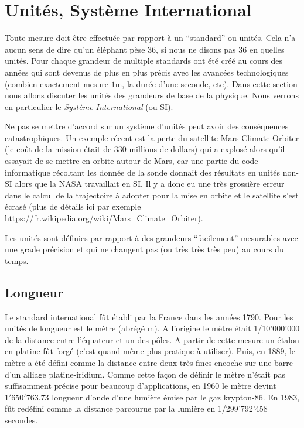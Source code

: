 \documentclass[a4paper,12pt]{book}
\newcommand{\m}{\mathrm{m}}
\begin{document}
\section{Unités, Système International}

Toute mesure doit être effectuée par rapport à un ``standard'' ou unités. Cela n'a aucun sens de dire qu'un éléphant pèse 36, si nous ne disons pas
36 en quelles unités. Pour chaque grandeur de multiple standards ont été créé au cours des années qui sont devenus de plus en plus précis
avec les avancées technologiques (combien exactement mesure $1\m$, la durée d'une seconde, etc). 
Dans cette section nous allons discuter les unités des grandeurs de base  de la physique. Nous verrons en particulier le \textit{Système International} (ou SI).

Ne pas se mettre d'accord sur un système d'unités peut avoir des conséquences catastrophiques. Un exemple récent 
est la perte du satellite Mars Climate Orbiter (le coût de la mission était de 330 millions de dollars) 
qui a explosé alors qu'il essayait de se mettre en orbite autour de Mars,
car une partie du code informatique récoltant les donnée de la sonde donnait des résultats en unités 
non-SI alors que la NASA travaillait en SI. Il y a donc eu une très grossière erreur dans le calcul
de la trajectoire à adopter pour la mise en orbite et le satellite s'est écrasé (plus de détails ici par exemple \url{https://fr.wikipedia.org/wiki/Mars_Climate_Orbiter}).

Les unités sont définies par rapport à des grandeurs ``facilement'' mesurables avec une grade précision et qui ne changent pas (ou très très très peu)
au cours du temps.

\subsection{Longueur}

Le standard international fût établi par la France dans les années 1790. 
Pour les unités de longueur est le mètre (abrégé $\m$). A l'origine le mètre était 1/10'000'000 de la distance entre l'équateur et un des pôles.
A partir de cette mesure un étalon en platine fût forgé (c'est quand même plus pratique à utiliser). Puis, en 1889, le mètre a été défini comme la distance entre deux très fines encoche sur une barre d'un alliage platine-iridium. Comme cette façon de définir le mètre n'était pas suffisamment précise pour beaucoup d'applications, en 1960
le mètre devint $1'650'763.73$ longueur d'onde d'une lumière émise par le gaz krypton-86. En 1983, fût redéfini comme la distance parcourue par la lumière en 1/299'792'458 secondes.
\end{document}
